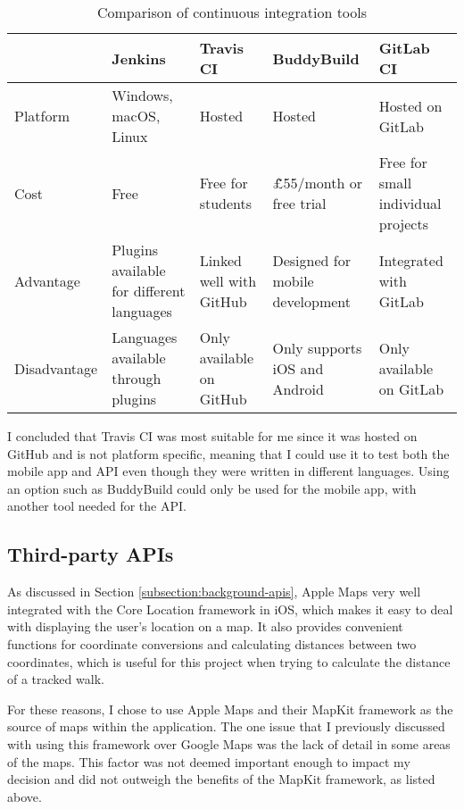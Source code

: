 \begin{table}[hbt]
  \centering
  \begin{tabular}{|m{2.1cm}||M{3cm}|M{3cm}|M{3cm}|M{3cm}|}
    \hline
     & Jenkins & Travis CI & BuddyBuild & GitLab CI \\
    \hline
    \hline
    Platform & Windows, macOS, Linux & Hosted & Hosted & Hosted on GitLab\\
    \hline
    Cost & Free & Free for students & \~\pounds55/month or free trial & Free for small individual projects\\
    \hline
    Advantage & Plugins available for different languages & Linked well with GitHub & Designed for mobile development & Integrated with GitLab\\
    \hline
    Disadvantage & Languages available through plugins & Only available on GitHub & Only supports iOS and Android & Only available on GitLab\\
    \hline
  \end{tabular}
  \caption{Comparison of continuous integration tools}
  \label{table:ci-tools-options}
\end{table}




I concluded that Travis CI was most suitable for me since it was hosted on GitHub and is not platform specific, meaning that I could use it to test both the mobile app and API even though they were written in different languages. Using an option such as BuddyBuild could only be used for the mobile app, with another tool needed for the API.

\subsection{Third-party APIs}

As discussed in Section \ref{subsection:background-apis}, Apple Maps very well integrated with the Core Location framework in iOS, which makes it easy to deal with displaying the user's location on a map. It also provides convenient functions for coordinate conversions and calculating distances between two coordinates, which is useful for this project when trying to calculate the distance of a tracked walk.

For these reasons, I chose to use Apple Maps and their MapKit framework as the source of maps within the application. The one issue that I previously discussed with using this framework over Google Maps was the lack of detail in some areas of the maps. This factor was not deemed important enough to impact my decision and did not outweigh the benefits of the MapKit framework, as listed above.

